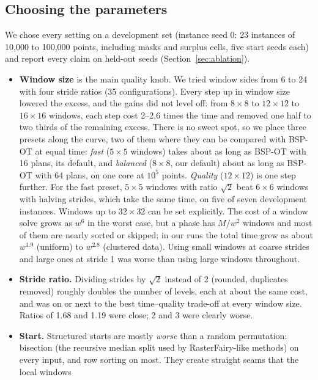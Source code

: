 \subsection{Choosing the parameters}
\label{sec:improve}

We chose every setting on a development set (instance seed 0: 23 instances of 10{,}000 to
100{,}000 points, including masks and surplus cells, five start seeds each) and report
every claim on held-out seeds (Section~\ref{sec:ablation}).

\begin{itemize}
\item \textbf{Window size} is the main quality knob. We tried window sides from 6 to 24
  with four stride ratios (35 configurations). Every step up in window size lowered the
  excess, and the gains did not level off: from $8\times8$ to $12\times12$ to $16\times16$
  windows, each step cost 2--2.6 times the time and removed one half to two thirds of the
  remaining excess. There is no sweet spot, so we place three presets along the curve, two of
  them where they can be compared with BSP-OT at equal time: \emph{fast} ($5\times5$ windows)
  takes about as long as BSP-OT with 16 plans, its default, and \emph{balanced} ($8\times8$,
  our default) about as long as BSP-OT with 64 plans, on one core at $10^5$ points.
  \emph{Quality} ($12\times12$) is one step further. For the fast preset, $5\times5$ windows
  with ratio $\sqrt2$ beat $6\times6$ windows with halving strides, which take the same time,
  on five of seven development instances. Windows up to $32\times32$ can be set explicitly. The cost of a window
  solve grows as $w^6$ in the worst case, but a phase has $M/w^2$ windows and most of them
  are nearly sorted or skipped; in our runs the total time grew as about $w^{1.9}$ (uniform)
  to $w^{2.8}$ (clustered data). Using small windows at coarse strides and large ones at
  stride 1 was worse than using large windows throughout.
\item \textbf{Stride ratio.} Dividing strides by $\sqrt2$ instead of 2 (rounded, duplicates
  removed) roughly doubles the number of levels, each at about the same cost, and was on
  or next to the best time--quality trade-off at every window size. Ratios of 1.68 and
  1.19 were close; 2 and 3 were clearly worse.
\item \textbf{Start.} Structured starts are mostly \emph{worse} than a random
  permutation: bisection (the recursive median split used by RasterFairy-like methods) on
  every input, and row sorting on most. They create straight seams that the local windows

\end{itemize}
